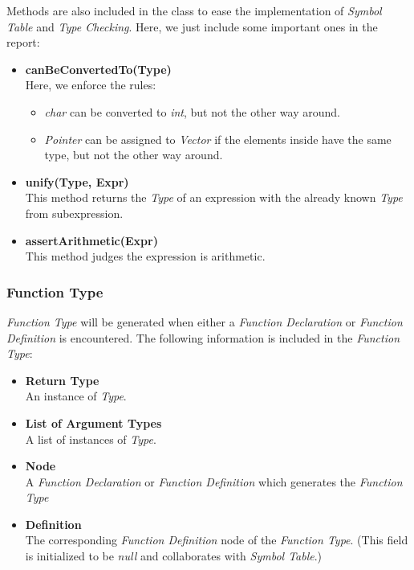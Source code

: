 \documentclass[a4paper,11pt]{article}
\begin{document}
Methods are also included in the class to ease the implementation of \emph{Symbol Table} and \emph{Type Checking}. Here, we just include some important ones in the report:
\begin{itemize}
	\item \textbf{canBeConvertedTo(Type)} \\
	Here, we enforce the rules:
	\begin{itemize}
		\item  \emph{char} can be converted to \emph{int}, but not the other way around.
		\item \emph{Pointer} can be assigned to \emph{Vector} if the elements inside have the same type, but not the other way around.
	\end{itemize}
	
	\item \textbf{unify(Type, Expr)} \\
	This method returns the \emph{Type} of an expression with the already known \emph{Type} from subexpression.
	
	\item \textbf{assertArithmetic(Expr)} \\
	This method judges the expression is arithmetic.
\end{itemize}



\subsubsection{Function Type}
	\emph{Function Type} will be generated when either a \emph{Function Declaration} or \emph{Function Definition} is encountered. The following information is included in the \emph{Function Type}:
	\begin{itemize}
	\item \textbf{Return Type} \\
		An instance of \emph{Type}.
	\item \textbf{List of Argument Types} \\
		A list of instances of \emph{Type}.
	\item \textbf{Node} \\
		A \emph{Function Declaration} or \emph{Function Definition} which generates the \emph{Function Type}
	\item \textbf{Definition} \\
		The corresponding \emph{Function Definition} node of the \emph{Function Type}. (This field is initialized to be \emph{null} and collaborates with \emph{Symbol Table}.)	
	\end{itemize}	
	 
\end{document}
